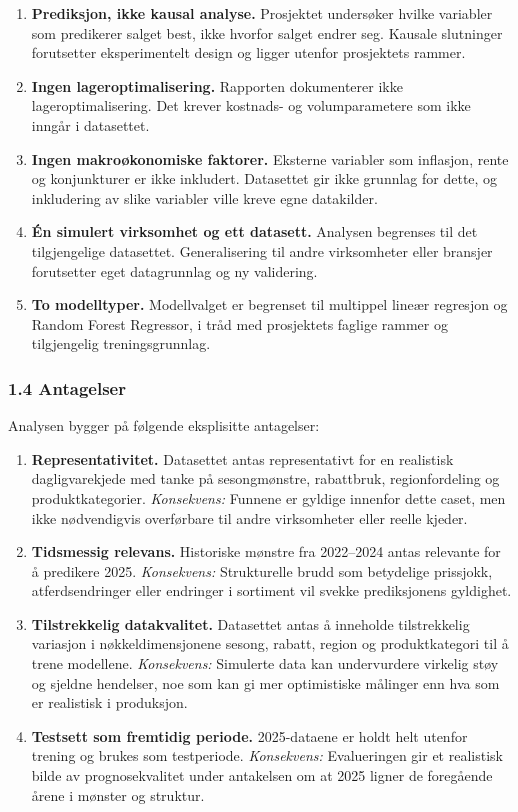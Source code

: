\documentclass[
  11pt,
]{article}
\providecommand{\tightlist}{%
  \setlength{\itemsep}{0pt}\setlength{\parskip}{0pt}}
\begin{document}
\begin{enumerate}
\def\labelenumi{\arabic{enumi}.}
\tightlist
\item
  \textbf{Prediksjon, ikke kausal analyse.} Prosjektet undersøker hvilke variabler som predikerer salget best, ikke
  hvorfor salget endrer seg. Kausale slutninger forutsetter eksperimentelt design og ligger utenfor prosjektets rammer.
\item
  \textbf{Ingen lageroptimalisering.} Rapporten dokumenterer ikke lageroptimalisering. Det krever kostnads- og
  volumparametere som ikke inngår i datasettet.
\item
  \textbf{Ingen makroøkonomiske faktorer.} Eksterne variabler som inflasjon, rente og konjunkturer er ikke inkludert.
  Datasettet gir ikke grunnlag for dette, og inkludering av slike variabler ville kreve egne datakilder.
\item
  \textbf{Én simulert virksomhet og ett datasett.} Analysen begrenses til det tilgjengelige datasettet. Generalisering
  til andre virksomheter eller bransjer forutsetter eget datagrunnlag og ny validering.
\item
  \textbf{To modelltyper.} Modellvalget er begrenset til multippel lineær regresjon og Random Forest Regressor, i tråd
  med prosjektets faglige rammer og tilgjengelig treningsgrunnlag.
\end{enumerate}

\hypertarget{antagelser}{%
\subsubsection{1.4 Antagelser}\label{antagelser}}

Analysen bygger på følgende eksplisitte antagelser:

\begin{enumerate}
\def\labelenumi{\arabic{enumi}.}
\tightlist
\item
  \textbf{Representativitet.} Datasettet antas representativt for en realistisk dagligvarekjede med tanke på
  sesongmønstre, rabattbruk, regionfordeling og produktkategorier. \emph{Konsekvens:} Funnene er gyldige innenfor dette
  caset, men ikke nødvendigvis overførbare til andre virksomheter eller reelle kjeder.
\item
  \textbf{Tidsmessig relevans.} Historiske mønstre fra 2022--2024 antas relevante for å predikere 2025.
  \emph{Konsekvens:} Strukturelle brudd som betydelige prissjokk, atferdsendringer eller endringer i sortiment vil
  svekke prediksjonens gyldighet.
\item
  \textbf{Tilstrekkelig datakvalitet.} Datasettet antas å inneholde tilstrekkelig variasjon i nøkkeldimensjonene sesong,
  rabatt, region og produktkategori til å trene modellene. \emph{Konsekvens:} Simulerte data kan undervurdere virkelig
  støy og sjeldne hendelser, noe som kan gi mer optimistiske målinger enn hva som er realistisk i produksjon.
\item
  \textbf{Testsett som fremtidig periode.} 2025-dataene er holdt helt utenfor trening og brukes som testperiode.
  \emph{Konsekvens:} Evalueringen gir et realistisk bilde av prognosekvalitet under antakelsen om at 2025 ligner de
  foregående årene i mønster og struktur.
\end{enumerate}
\end{document}
